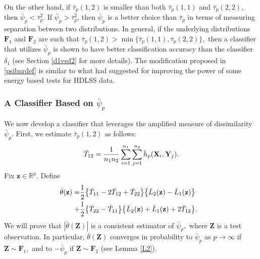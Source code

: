 \documentclass[twoside]{article}
\newcommand{\bX}{\mathbf{X}}
\newcommand{\bY}{\mathbf{Y}}
\newcommand{\bZ}{\mathbf{Z}}
\newcommand{\bF}{\mathbf{F}}
\newcommand{\bz}{\mathbf{z}}
\newcommand{\0}{\mathbf{0}}
\newcommand{\1}{\mathbf{1}}
\numberwithin{equation}{section}
\begin{document}
On the other hand, if $\bar{\tau}_p(1,2)$ is smaller than both $\bar{\tau}_p(1,1)$ and $\bar{\tau}_p(2,2),$ then $\bar{\psi}_p< \bar{\tau}^2_p.$ If $\bar{\psi}_p> \bar{\tau}^2_p$, then $\bar{\psi}_p$ is a better choice than $\bar{\tau}_p$ in terms of measuring separation between two distributions. %
In general, if the underlying distributions $\bF_1$ and $\bF_2$ are such that $\bar{\tau}_p(1,2)>\min\{\bar{\tau}_p(1,1),\bar{\tau}_p(2,2)\},$ then a classifier that utilizes $\bar{\psi}_p$ is shown to have better classification accuracy than the classifier $\delta_1$ (see Section \ref{d1vsd2} for more details). The modification proposed in \eqref{psibardef} is similar to what \cite{biswas2014nonparametric} had suggested for improving the power of some energy based tests for HDLSS data.
\subsubsection{A Classifier Based on $\bar{\psi}_p$}\label{method.improvclass}
We now develop a classifier that leverages the amplified measure of dissimilarity $\bar{\psi}_p.$ First, we estimate $\bar{\tau}_p(1,2)$ as follows:
\begin{align}\label{T12def}
{\bar{T}}_{12} =\frac{1}{n_1n_2}\sum\limits_{ i=1}^{n_1}\sum\limits_{ j=1}^{n_2}\bar{h}_p(\bX_i,\bY_j).
\vspace{-0.35cm}
\end{align}
Fix $\bz\in\mathbb{R}^p$. Define
\begin{align}\label{thetabardef}
\hspace{-0.25cm}\bar{\theta}(\bz) =&\frac{1}{2}\big\{\bar{T}_{11}-2\bar{T}_{12}+\bar{T}_{22}\big\}\big\{\bar{L}_2(\bz)-\bar{L}_1(\bz)\big\}\nonumber \\
 +& \frac{1}{2}\big\{\bar{T}_{22}-\bar{T}_{11}\big\}\big\{\bar{L}_2(\bz)+\bar{L}_1(\bz)+2\bar{T}_{12}\big \}.
\end{align}
We will prove that $|\bar{\theta}(\bZ)|$ is a consistent estimator of $\bar{\psi}_p,$ where $\bZ$ is a test observation. In particular, $\bar{\theta}(\bZ)$ converges in probability to $\bar{\psi}_p$ as $p\to\infty$ if $\bZ\sim\bF_1,$ and to $-\bar{\psi}_p$ if $\bZ\sim\bF_2$ (see Lemma \ref{L2}).
\end{document}
